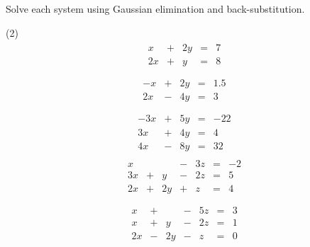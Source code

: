 \documentclass[12pt,fleqn]{book}
\newcommand{\prb}[1]{\begin{Exercise}#1\end{Exercise}}
\begin{document}
\clearpage
\prb{Solve each system using Gaussian elimination and back-substitution.
\begin{tasks}(2)
	\task \vspace{-2.3em}
		\begin{align*}
		\begin{array}{rrrrr}
			  x &+&2y&=&7 \\
			  2x&+& y&=&8 \\
		\end{array}
		\end{align*}
	\task \vspace{-2.3em}
		\begin{align*}
		\begin{array}{rrrrr}
			  -x&+&2y&=&1.5 \\
			  2x&-&4y&=&3 \\
		\end{array}
		\end{align*}
		\vspace{4in}
	\task \vspace{-2.3em}
		\begin{align*}
		\begin{array}{rrrrr}
			  -3x&+&5y&=&-22 \\
			   3x&+&4y&=&4 \\
			  4x &-&8y&=&32
		\end{array}
		\end{align*}
	\task \vspace{-2.3em}
		\begin{align*}
		\begin{array}{rrrrrrr}
			  x &&&   -&3z&=&-2 \\
			  3x&+& y&-&2z&=&5 \\
			  2x&+&2y&+& z&=&4 \\
		\end{array}
		\end{align*}
		\vspace{4in}
	\task \vspace{-2.3em}
	\begin{align*}
		\begin{array}{rrrrrrr}
			x&+&  &-&5z&=&3 \\
			x&+& y&-&2z&=&1 \\
			2x&-&2y&-& z&=&0
		\end{array}
	\end{align*}
	\vspace{5in}
	\task \vspace{-2.3em}
		\begin{align*}

\end{align*}
\end{tasks}}
\end{document}
